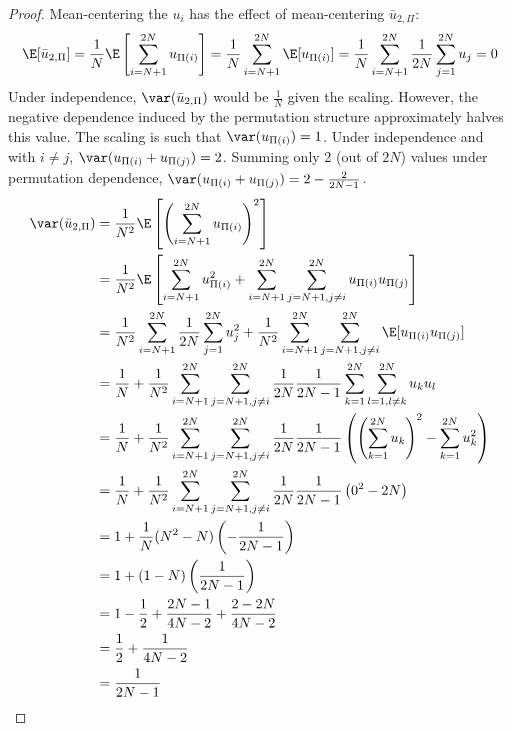 \begin{proof}
  Mean-centering the $u_{i}$ has the effect of mean-centering $\bar{u}_{2,\Pi}$:
  \begin{equation*}
    \E[\bar{u}_{2,\Pi}] = 
    \frac{1}{N} \E \left [ \sum_{i=N+1}^{2N} u_{\Pi(i)} \right ] = 
    \frac{1}{N} \sum_{i=N+1}^{2N} \E[u_{\Pi(i)}] = 
    \frac{1}{N} \sum_{i=N+1}^{2N} \frac{1}{2N} \sum_{j=1}^{2N} u_{j} = 0
  \end{equation*}
  Under independence, $\var(\bar{u}_{2,\Pi})$ would be $\frac{1}{N}$ given
  the scaling.  However, the negative dependence induced by the
  permutation structure approximately halves this value.
  The scaling is such that $\var(u_{\Pi(i)}) = 1$.  Under independence and
  with $i \neq j$, $\var(u_{\Pi(i)} + u_{\Pi(j)}) = 2$.  Summing only 2 (out of $2N$)
  values under permutation dependence, $\var(u_{\Pi(i)} + u_{\Pi(j)}) = 2 - \frac{2}{2N-1}$.
  \begin{align*}
    \var(\bar{u}_{2,\Pi}) 
    &= \frac{1}{N^2} \E \left [\left (\sum_{i=N+1}^{2N}u_{\Pi(i)}\right )^2\right ] \\
    &= \frac{1}{N^2} \E \left [\sum_{i=N+1}^{2N} u_{\Pi(i)}^2 +
    \sum_{i=N+1}^{2N}\sum_{j=N+1, j\neq i}^{2N}u_{\Pi(i)}u_{\Pi(j)} \right ] \\
    &= \frac{1}{N^2} \sum_{i=N+1}^{2N} \frac{1}{2N} \sum_{j=1}^{2N} u_{j}^2
    + \frac{1}{N^2}\sum_{i=N+1}^{2N}\sum_{j=N+1, j\neq
      i}^{2N} \E[u_{\Pi(i)} u_{\Pi(j)}] \\
    &= \frac{1}{N} + \frac{1}{N^2}\sum_{i=N+1}^{2N}\sum_{j=N+1, j\neq
      i}^{2N} \frac{1}{2N}\frac{1}{2N-1}\sum_{k=1}^{2N}
    \sum_{l=1, l\neq k}^{2N} u_ku_l \\
    &= \frac{1}{N} + \frac{1}{N^2}\sum_{i=N+1}^{2N}\sum_{j=N+1, j\neq
      i}^{2N} \frac{1}{2N}\frac{1}{2N-1} \left (
    \left (\sum_{k=1}^{2N} u_k \right )^2 - \sum_{k=1}^{2N} u_k^2
  \right ) \\
    &= \frac{1}{N} + \frac{1}{N^2}\sum_{i=N+1}^{2N}\sum_{j=N+1, j\neq
      i}^{2N} \frac{1}{2N}\frac{1}{2N-1} \left (
    0^2 - 2N \right ) \\
    &= 1 + \frac{1}{N}(N^2-N)\left (-\frac{1}{2N-1}\right ) \\
    &= 1 + (1-N)\left (\frac{1}{2N-1}\right ) \\
    &= 1 - \frac{1}{2} + \frac{2N-1}{4N-2} + \frac{2-2N}{4N-2} \\
    &= \frac{1}{2} + \frac{1}{4N-2} \\
    &= \frac{1}{2N-1}
  \end{align*}


\end{proof}
